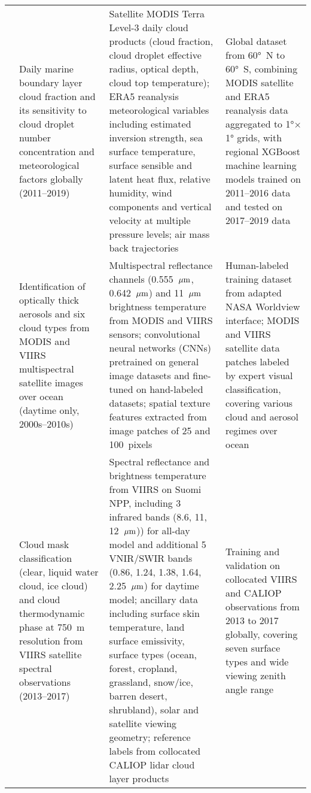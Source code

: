 \documentclass[11pt]{article}
\begin{document}
\begin{landscape}
\begin{longtable}{>{\raggedright\arraybackslash}p{2cm} 
        >{\raggedright\arraybackslash}p{4cm} 
        >{\raggedright\arraybackslash}p{10cm} 
        >{\raggedright\arraybackslash}p{6cm}}
\citet{jia2024analysis} & Daily marine boundary layer cloud fraction and its sensitivity to cloud droplet number concentration and meteorological factors globally (2011–2019) & Satellite MODIS Terra Level-3 daily cloud products (cloud fraction, cloud droplet effective radius, optical depth, cloud top temperature); ERA5 reanalysis meteorological variables including estimated inversion strength, sea surface temperature, surface sensible and latent heat flux, relative humidity, wind components and vertical velocity at multiple pressure levels; air mass back trajectories & Global dataset from 60°~N to 60°~S, combining MODIS satellite and ERA5 reanalysis data aggregated to 1°$\times$1° grids, with regional XGBoost machine learning models trained on 2011–2016 data and tested on 2017–2019 data \\[6pt]

\citet{marais2020leveraging} & Identification of optically thick aerosols and six cloud types from MODIS and VIIRS multispectral satellite images over ocean (daytime only, 2000s–2010s) & Multispectral reflectance channels (0.555~\(\mu \rm m\), 0.642~\(\mu \rm m\)) and 11~\(\mu \rm m\) brightness temperature from MODIS and VIIRS sensors; convolutional neural networks (CNNs) pretrained on general image datasets and fine-tuned on hand-labeled datasets; spatial texture features extracted from image patches of 25 and 100~pixels & Human-labeled training dataset from adapted NASA Worldview interface; MODIS and VIIRS satellite data patches labeled by expert visual classification, covering various cloud and aerosol regimes over ocean \\[6pt]

\citet{wang2020machine} & Cloud mask classification (clear, liquid water cloud, ice cloud) and cloud thermodynamic phase at 750~m resolution from VIIRS satellite spectral observations (2013–2017) & Spectral reflectance and brightness temperature from VIIRS on Suomi NPP, including 3 infrared bands (8.6, 11, 12~\(\mu \rm m\))) for all-day model and additional 5 VNIR/SWIR bands (0.86, 1.24, 1.38, 1.64, 2.25~\(\mu \rm m\)) for daytime model; ancillary data including surface skin temperature, land surface emissivity, surface types (ocean, forest, cropland, grassland, snow/ice, barren desert, shrubland), solar and satellite viewing geometry; reference labels from collocated CALIOP lidar cloud layer products & Training and validation on collocated VIIRS and CALIOP observations from 2013 to 2017 globally, covering seven surface types and wide viewing zenith angle range \\[6pt]


\end{longtable}
\end{landscape}
\end{document}
